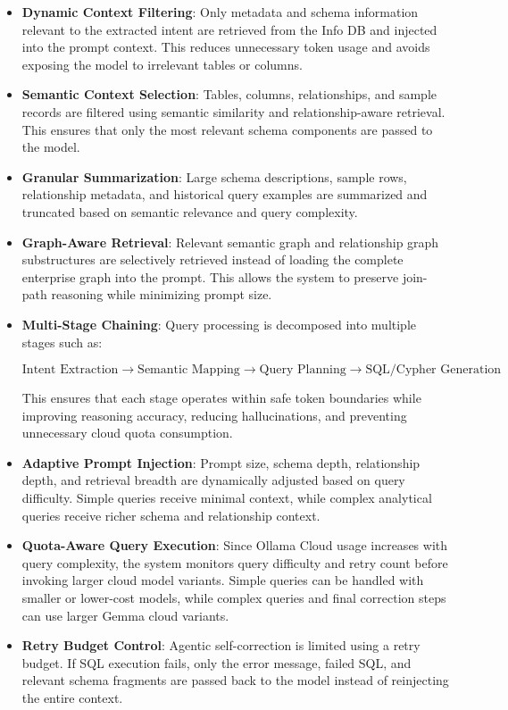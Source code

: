 \documentclass[11pt,a4paper]{article}
\begin{document}
\begin{itemize}
    \item \textbf{Dynamic Context Filtering}: Only metadata and schema information relevant to the extracted intent are retrieved from the Info DB and injected into the prompt context. This reduces unnecessary token usage and avoids exposing the model to irrelevant tables or columns.
    
    \item \textbf{Semantic Context Selection}: Tables, columns, relationships, and sample records are filtered using semantic similarity and relationship-aware retrieval. This ensures that only the most relevant schema components are passed to the model.
    
    \item \textbf{Granular Summarization}: Large schema descriptions, sample rows, relationship metadata, and historical query examples are summarized and truncated based on semantic relevance and query complexity.
    
    \item \textbf{Graph-Aware Retrieval}: Relevant semantic graph and relationship graph substructures are selectively retrieved instead of loading the complete enterprise graph into the prompt. This allows the system to preserve join-path reasoning while minimizing prompt size.
    
    \item \textbf{Multi-Stage Chaining}: Query processing is decomposed into multiple stages such as:
    
    \[
    \text{Intent Extraction}
    \rightarrow
    \text{Semantic Mapping}
    \rightarrow
    \text{Query Planning}
    \rightarrow
    \text{SQL/Cypher Generation}
    \]
    
    This ensures that each stage operates within safe token boundaries while improving reasoning accuracy, reducing hallucinations, and preventing unnecessary cloud quota consumption.
    
    \item \textbf{Adaptive Prompt Injection}: Prompt size, schema depth, relationship depth, and retrieval breadth are dynamically adjusted based on query difficulty. Simple queries receive minimal context, while complex analytical queries receive richer schema and relationship context.
    
    \item \textbf{Quota-Aware Query Execution}: Since Ollama Cloud usage increases with query complexity, the system monitors query difficulty and retry count before invoking larger cloud model variants. Simple queries can be handled with smaller or lower-cost models, while complex queries and final correction steps can use larger Gemma cloud variants.
    
    \item \textbf{Retry Budget Control}: Agentic self-correction is limited using a retry budget. If SQL execution fails, only the error message, failed SQL, and relevant schema fragments are passed back to the model instead of reinjecting the entire context.
\end{itemize}
\end{document}
